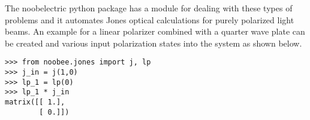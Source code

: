 The noobelectric python package has a module for dealing with these types of problems and it automates Jones optical calculations for purely polarized light beams.  An example for a linear polarizer combined with a quarter wave plate can be created and various input polarization states into the system as shown below.
\begin{lstlisting}
>>> from noobee.jones import j, lp
>>> j_in = j(1,0)
>>> lp_1 = lp(0)
>>> lp_1 * j_in
matrix([[ 1.],
        [ 0.]])
\end{lstlisting}
